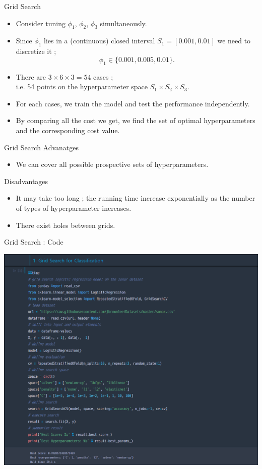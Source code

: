 \documentclass{beamer}
\begin{document}
%
\begin{frame}{Grid Search}
\begin{itemize}
\item
Consider tuning \(\phi_1\), \(\phi_2\), \(\phi_3\) simultaneously.
\item
Since \(\phi_1\) lies in a (continuous) closed interval \(S_1=[0.001,0.01]\) we need to discretize it ;
\[\phi_1\in\{0.001, 0.005, 0.01\}.\]
\item
There are \(3\times 6\times 3=54\) cases ;\\
i.e. 54 points on the hyperparameter space \(S_1\times S_2\times S_3\).%
\item
For each cases, we train the model and test the performance independently.
\item
By comparing all the cost we get, we find the set of optimal hyperparameters and the corresponding cost value.
\end{itemize}
\end{frame}

%
\begin{frame}{Grid Search}
Advanatges
\begin{itemize}
\item
We can cover all possible prospective sets of hyperparameters.
\end{itemize}
Disadvantages
\begin{itemize}
\item
It may take too long ; the running time increase exponentially as the number of types of hyperparameter increases.
\item
There exist holes between grids.
\end{itemize}
\end{frame}

%
\begin{frame}{Grid Search : Code}
\begin{center}
\includegraphics[width=.75\textwidth]{2_2_grid_search}
\end{center}
\end{frame}
\end{document}
